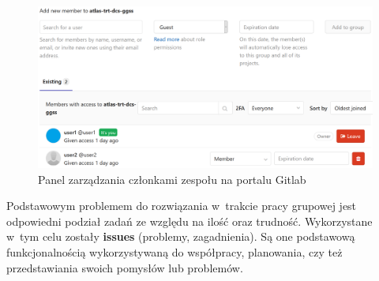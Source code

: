 \begin{figure}[H]
\centering
\caption{Panel zarządzania członkami zespołu na portalu Gitlab}
\label{fig:memMan}
\includegraphics[width=\textwidth]{res/png/memberManagementPanel}
\end{figure}


Podstawowym problemem do rozwiązania w~trakcie pracy grupowej jest odpowiedni podział zadań ze względu na ilość oraz trudność. Wykorzystane w~tym celu zostały \textbf{issues} (problemy, zagadnienia). Są one podstawową funkcjonalnością wykorzystywaną do współpracy, planowania, czy też przedstawiania swoich pomysłów lub problemów.

